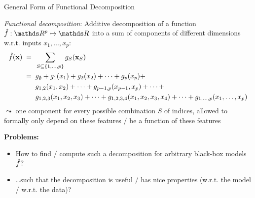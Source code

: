 \documentclass[10pt,compress,t,notes=noshow, xcolor=table]{beamer}
\newcommand{\open}{}
\newcommand{\close}{}
\begin{document}
\begin{frame}{General Form of Functional Decomposition
}

\begin{definition}
\textit{Functional decomposition}: Additive decomposition of a function $\fh: \R^p \mapsto \R$ into a sum of components of different dimensions w.r.t. inputs $x_1, \ldots, x_p$: 
\begin{equation*}
\begin{split}
\fh(\xv)
\; = \; \; & \sum_{S \subseteq \{1,\ldots,p\}} g_{S}(\xv_S) \\
\; = \; \; & g_{\open \emptyset \close} +
g_{\open 1 \close}(x_1) + g_{\open 2 \close}(x_2) + \dots + g_{\open p \close}(x_p) + \\
& g_{\open 1, 2 \close}(x_1, x_2) + \dots + g_{\open p-1, p \close}(x_{p-1}, x_p) + \dots + \\
& g_{\open 1, 2, 3 \close}(x_1, x_2, x_3) + \dots +
g_{\open 1, 2, 3, 4 \close}(x_1, x_2, x_3, x_4) + \dots +
g_{\open 1,\ldots,p \close}(x_1, \ldots, x_p)
\end{split}    
\end{equation*}
$\leadsto$ one component for every possible combination $S$ of indices, allowed to formally only depend on these features / be a function of these features
\end{definition}

\textbf{Problems:}
\begin{itemize}
    \item How to find / compute such a decomposition for arbitrary black-box models $\hat{f}$?
    \item \dots such that the decomposition is useful / has nice properties (w.r.t. the model / w.r.t. the data)?
\end{itemize}

\end{frame}
\end{document}
